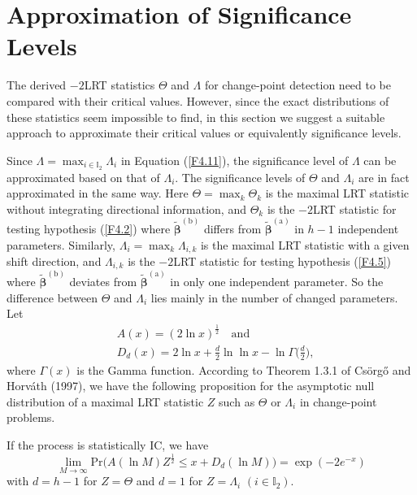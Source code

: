 \section{Approximation of Significance Levels}\label{sec4.4}

The derived $-2$LRT statistics $\Theta$ and $\Lambda$ for change-point detection
need to be compared with their critical values. However, since the exact
distributions of these statistics seem impossible to find, in this section we
suggest a suitable approach to approximate their critical values or equivalently
significance levels.

Since $\Lambda=\max_{i\in\mathbb{I}_2}\Lambda_i$ in Equation (\ref{F4.11}), the
significance level of $\Lambda$ can be approximated based on that of $\Lambda_i$.
The significance levels of $\Theta$ and $\Lambda_i$ are in fact approximated in the
same way. Here $\Theta=\max_k\Theta_k$ is the maximal LRT statistic without
integrating directional information, and $\Theta_k$ is the $-2$LRT statistic for
testing hypothesis (\ref{F4.2}) where $\widetilde{\bm{\beta}}^{(\mathrm{b})}$
differs from $\widetilde{\bm{\beta}}^{(\mathrm{a})}$ in $h-1$ independent
parameters. Similarly, $\Lambda_i=\max_k\Lambda_{i,k}$ is the maximal LRT statistic
with a given shift direction, and $\Lambda_{i,k}$ is the $-2$LRT statistic for
testing hypothesis (\ref{F4.5}) where $\widetilde{\bm{\beta}}^{(\mathrm{b})}$
deviates from $\widetilde{\bm{\beta}}^{(\mathrm{a})}$ in only one independent
parameter. So the difference between $\Theta$ and $\Lambda_i$ lies mainly in the
number of changed parameters. Let
\begin{align*}
& A(x)=(2\ln x)^{\frac{1}{2}}\quad\mathrm{and}\\
& D_d(x)=2\ln x+\frac{d}{2}\ln\ln x-\ln\Gamma\Big(\frac{d}{2}\Big),
\end{align*}
where $\Gamma(x)$ is the Gamma function. According to Theorem 1.3.1 of
Cs\"{o}rg\H{o} and Horv\'{a}th (1997), we have the following proposition for the
asymptotic null distribution of a maximal LRT statistic $Z$ such as $\Theta$ or
$\Lambda_i$ in change-point problems.
\begin{pro}
If the process is statistically IC, we have
\[
\lim_{M\to\infty}\mathrm{Pr}\Big(A(\ln M)Z^{\frac{1}{2}}\leq x+D_d(\ln
M)\Big)=\exp(-2e^{-x})
\]
with $d=h-1$ for $Z=\Theta$ and $d=1$ for $Z=\Lambda_i$ $(i\in\mathbb{I}_2)$.
\end{pro}

